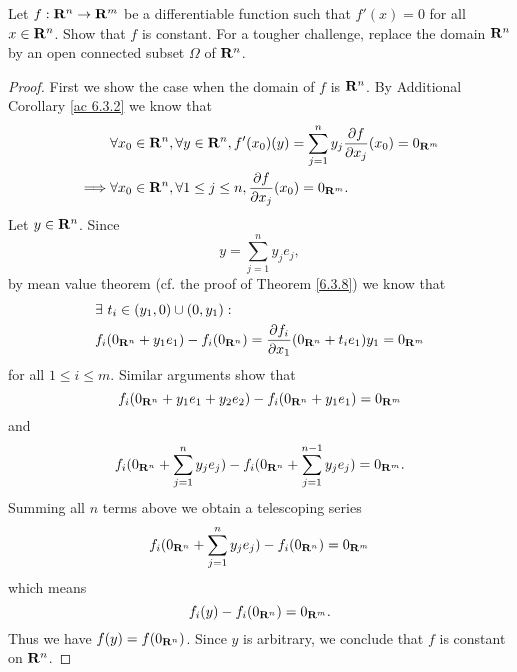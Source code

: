 \begin{exercise}\label{ex 6.3.4}
    Let \(f : \mathbf{R}^n \to \mathbf{R}^m\) be a differentiable function such that \(f'(x) = 0\) for all \(x \in \mathbf{R}^n\).
    Show that \(f\) is constant.
    For a tougher challenge, replace the domain \(\mathbf{R}^n\) by an open connected subset \(\Omega\) of \(\mathbf{R}^n\).
\end{exercise}

\begin{proof}
    First we show the case when the domain of \(f\) is \(\mathbf{R}^n\).
    By Additional Corollary \ref{ac 6.3.2} we know that
    \begin{align*}
                 & \forall x_0 \in \mathbf{R}^n, \forall y \in \mathbf{R}^n, f'(x_0)(y) = \sum_{j = 1}^n y_j \frac{\partial f}{\partial x_j}(x_0) = 0_{\mathbf{R}^m} \\
        \implies & \forall x_0 \in \mathbf{R}^n, \forall 1 \leq j \leq n, \frac{\partial f}{\partial x_j}(x_0) = 0_{\mathbf{R}^m}.
    \end{align*}
    Let \(y \in \mathbf{R}^n\).
    Since
    \[
        y = \sum_{j = 1}^n y_j e_j,
    \]
    by mean value theorem (cf. the proof of Theorem \ref{6.3.8}) we know that
    \begin{align*}
         & \exists\ t_i \in (y_1, 0) \cup (0, y_1) :                                                                      \\
         & f_i(0_{\mathbf{R}^n} + y_1 e_1) - f_i(0_{\mathbf{R}^n}) = \frac{\partial f_i}{\partial x_1}(0_{\mathbf{R}^n} + t_i e_1) y_1 = 0_{\mathbf{R}^m}
    \end{align*}
    for all \(1 \leq i \leq m\).
    Similar arguments show that
    \[
        f_i(0_{\mathbf{R}^n} + y_1 e_1 + y_2 e_2) - f_i(0_{\mathbf{R}^n} + y_1 e_1) = 0_{\mathbf{R}^m}
    \]
    and
    \[
        f_i(0_{\mathbf{R}^n} + \sum_{j = 1}^n y_j e_j) - f_i(0_{\mathbf{R}^n} + \sum_{j = 1}^{n - 1} y_j e_j) = 0_{\mathbf{R}^m}.
    \]
    Summing all \(n\) terms above we obtain a telescoping series
    \[
        f_i(0_{\mathbf{R}^n} + \sum_{j = 1}^n y_j e_j) - f_i(0_{\mathbf{R}^n}) = 0_{\mathbf{R}^m}
    \]
    which means
    \[
        f_i(y) - f_i(0_{\mathbf{R}^n}) = 0_{\mathbf{R}^m}.
    \]
    Thus we have \(f(y) = f(0_{\mathbf{R}^n})\).
    Since \(y\) is arbitrary, we conclude that \(f\) is constant on \(\mathbf{R}^n\).


\end{proof}

